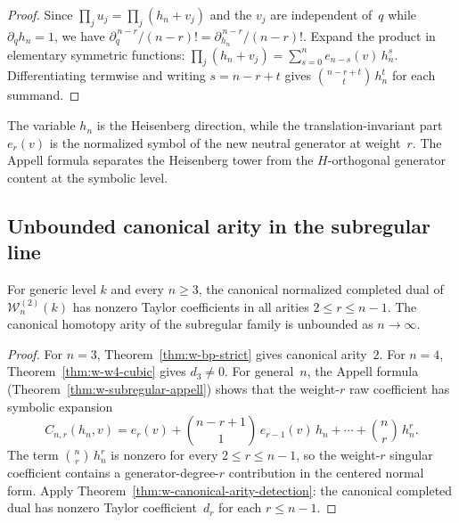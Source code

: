 \begin{proof}
Since $\prod_j u_j = \prod_j (h_n + v_j)$ and the $v_j$ are
independent of~$q$ while $\partial_q h_n = 1$, we have
$\partial_q^{\,n-r}/(n-r)!
= \partial_{h_n}^{\,n-r}/(n-r)!$.  Expand the product in elementary
symmetric functions:
$\prod_j (h_n + v_j) = \sum_{s=0}^n e_{n-s}(v)\,h_n^s$.
Differentiating termwise and writing $s = n - r + t$ gives
$\binom{n-r+t}{t}\,h_n^t$ for each summand.
\end{proof}

\begin{remark}
\label{rem:w-normalized-symbols}
The variable $h_n$ is the Heisenberg direction, while the
translation-invariant part $e_r(v)$ is the normalized symbol of the
new neutral generator at weight~$r$.  The Appell formula separates
the Heisenberg tower from the $H$-orthogonal generator content at
the symbolic level.
\end{remark}

\subsection{Unbounded canonical arity in the subregular line}
\label{subsec:unbounded-arity}

\begin{theorem}
\label{thm:w-unbounded-canonical-arity}
For generic level $k$ and every $n \ge 3$, the canonical normalized
completed dual of $\mathcal{W}_n^{(2)}(k)$ has nonzero Taylor
coefficients in all arities $2 \le r \le n-1$.  The canonical
homotopy arity of the subregular family is unbounded as
$n \to \infty$.
\end{theorem}

\begin{proof}
For $n = 3$, Theorem~\ref{thm:w-bp-strict} gives canonical arity~$2$.
For $n = 4$, Theorem~\ref{thm:w-w4-cubic} gives $d_3 \neq 0$.  For
general~$n$, the Appell formula
(Theorem~\ref{thm:w-subregular-appell}) shows that the weight-$r$ raw
coefficient has symbolic expansion
\[
C_{n,r}(h_n, v) = e_r(v) + \binom{n-r+1}{1}\,e_{r-1}(v)\,h_n
+ \cdots + \binom{n}{r}\,h_n^r.
\]
The term $\binom{n}{r}\,h_n^r$ is nonzero for every
$2 \le r \le n-1$, so the weight-$r$ singular coefficient contains a
generator-degree-$r$ contribution in the centered normal form.  Apply
Theorem~\ref{thm:w-canonical-arity-detection}: the canonical
completed dual has nonzero Taylor coefficient~$d_r$ for each
$r \le n-1$.
\end{proof}

